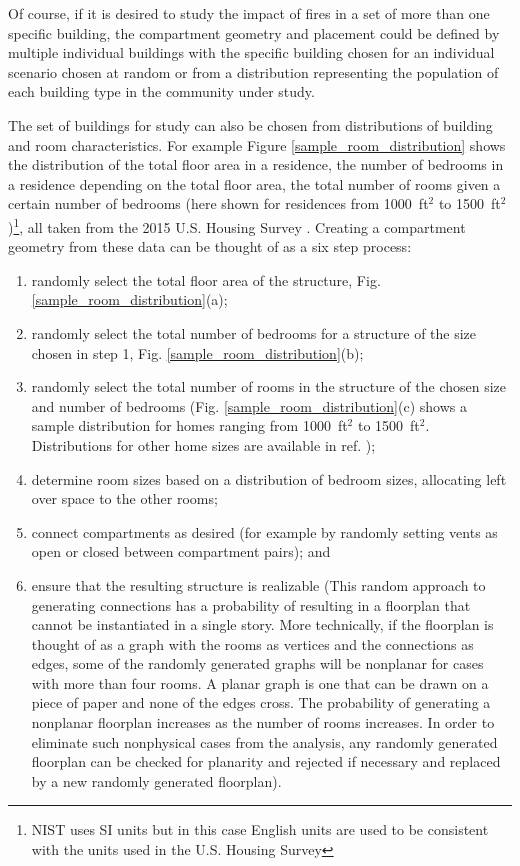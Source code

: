 \documentclass[12pt,twoside]{book}
\begin{document}
Of course, if it is desired to study the impact of fires in a set of more than one specific building, the compartment geometry and placement could be defined by multiple individual buildings with the specific building chosen for an individual scenario chosen at random or from a distribution representing the population of each building type in the community under study.

The set of buildings for study can also be chosen from distributions of building and room characteristics. For example Figure \ref{sample_room_distribution} shows the distribution of the total floor area in a residence, the number of bedrooms in a residence depending on the total floor area, the total number of rooms given a certain number of bedrooms (here shown for residences from 1000~ft$^2$ to 1500~ft$^2$)\footnote{NIST uses SI units but in this case English units are used to be consistent with the units used in the U.S. Housing Survey}, all taken from the 2015 U.S. Housing Survey \cite{AHS2015}. Creating a compartment geometry from these data can be thought of as a six step process:

\begin{enumerate}
    \item randomly select the total floor area of the structure, Fig. \ref{sample_room_distribution}(a);
    \item randomly select the total number of bedrooms for a structure of the size chosen in step 1, Fig. \ref{sample_room_distribution}(b);
    \item randomly select the total number of rooms in the structure of the chosen size and number of bedrooms (Fig. \ref{sample_room_distribution}(c) shows a sample distribution for homes ranging from 1000~ft$^2$ to 1500~ft$^2$. Distributions for other home sizes are available in ref. \cite{AHS2015});
    \item determine room sizes based on a distribution of bedroom sizes, allocating left over space to the other rooms;
    \item connect compartments as desired (for example by randomly setting vents as open or closed between compartment pairs); and
    \item ensure that the resulting structure is realizable (This random approach to generating connections has a probability of resulting in a floorplan that cannot be instantiated in a single story. More technically, if the floorplan is thought of as a graph with the rooms as vertices and the connections as edges, some of the randomly generated graphs will be nonplanar for cases with more than four rooms. A planar graph is one that can be drawn on a piece of paper and none of the edges cross. The probability of generating a nonplanar floorplan increases as the number of rooms increases. In order to eliminate such nonphysical cases from the analysis, any randomly generated floorplan can be checked for planarity and rejected if necessary and replaced by a new randomly generated floorplan).
\end{enumerate}
\end{document}
